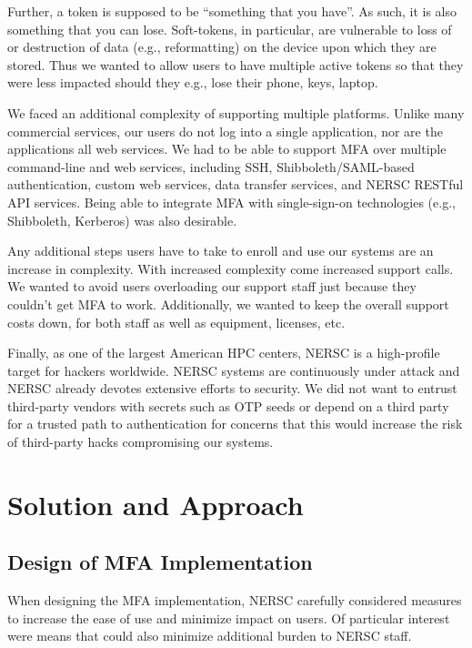 \documentclass[sigconf,review]{acmart}
\begin{document}
Further, a token is supposed to be ``something that you have''. As such, it is
also something that you can lose. Soft-tokens, in particular, are vulnerable to
loss of or destruction of data (e.g., reformatting) on the device upon which
they are stored. Thus we wanted to allow users to have multiple active tokens so
that they were less impacted should they e.g., lose their phone, keys, laptop.

We faced an additional complexity of supporting multiple platforms. Unlike many
commercial services, our users do not log into a single application, nor are the
applications all web services.  We had to be able to support MFA over multiple
command-line and web services, including SSH, Shibboleth/SAML-based
authentication, custom web services, data transfer services, and NERSC RESTful
API services.  Being able to integrate MFA with single-sign-on technologies
(e.g., Shibboleth, Kerberos) was also desirable.

Any additional steps users have to take to enroll and use our systems are an
increase in complexity.  With increased complexity come increased support calls.
We wanted to avoid users overloading our support staff just because they
couldn't get MFA to work.  Additionally, we wanted to keep the overall support
costs down, for both staff as well as equipment, licenses, etc.

Finally, as one of the largest American HPC centers, NERSC is a high-profile
target for hackers worldwide. NERSC systems are continuously under attack and
NERSC already devotes extensive efforts to security. We did not want to entrust
third-party vendors with secrets such as OTP seeds or depend on a third party
for a trusted path to authentication for concerns that this would increase the
risk of third-party hacks compromising our systems.


\section{Solution and Approach}
\label{solns}

\subsection{Design of MFA Implementation}
\label{design}

When designing the MFA implementation, NERSC carefully considered measures to
increase the ease of use and minimize impact on users. Of particular interest
were means that could also minimize additional burden to NERSC staff.
\end{document}

